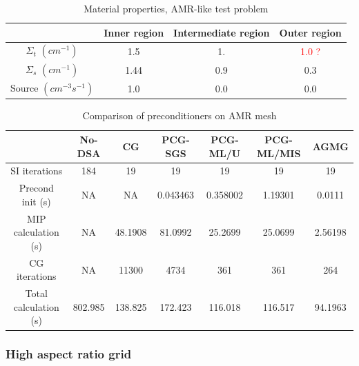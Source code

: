 %
\begin{table}
  \begin{center}
    \caption{Material properties, AMR-like test problem}
    \begin{tabular}{|c|c|c|c|}
      \hline
      & Inner region & Intermediate region & Outer region  \\ \hline
    $\Sigma_t$ $(cm^{-1})$ & 1.5  & 1.  & \textcolor{red}{1.0 ?} \\
    $\Sigma_s$ $(cm^{-1})$ & 1.44 & 0.9 & 0.3 \\
  Source $(cm^{-3}s^{-1})$ & 1.0  & 0.0 & 0.0 \\
      \hline
    \end{tabular}
    \label{prop_amr}
  \end{center}
\end{table}
%
\begin{table}[H]
  \caption{Comparison of preconditioners on AMR mesh}
  \begin{center}
    \begin{tabular}{|c|c|c|c|c|c|c|}
      \hline
       & No-DSA & CG & PCG-SGS & PCG-ML/U & PCG-ML/MIS & AGMG \\
      \hline
   SI iterations & 184     & 19      & 19       & 19      & 19       & 19 \\
Precond init (s) & NA      & NA      & 0.043463 & 0.358002 & 1.19301 & 0.0111\\
MIP calculation (s) & NA   & 48.1908 & 81.0992  & 25.2699 & 25.0699  & 
      2.56198\\
   CG iterations & NA      & 11300   & 4734     & 361     & 361      & 264 \\
     Total calculation (s) & 802.985 & 138.825 & 172.423  & 116.018 & 116.517  &
      94.1963\\
      \hline
    \end{tabular}
    \label{table_amr}
  \end{center}
\end{table}

\subsubsection{High aspect ratio grid}

